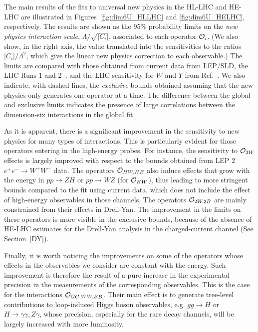 The main results of the fits to universal new physics in the HL-LHC and HE-LHC are illustrated in Figures~\ref{fig:dim6U_HLLHC} and \ref{fig:dim6U_HELHC}, respectively.
The results are shown as the 95\% probability limits on the {\it new physics interaction scale}, $\Lambda/\sqrt{\vert C_i\vert }$, associated to each operator ${\cal O}_i$. (We also show, in the right axis, the value translated into the sensitivities to the ratios $\vert C_i\vert /\Lambda^2$, which give the linear new physics correction to each observable.)
The limits are compared with those obtained from current data from LEP/SLD, the LHC Runs 1 and 2~\cite{deBlas:2016ojx,deBlas:2016nqo,deBlas:2017wmn,hepfit:2019}, and the LHC sensitivity for $W$ and $Y$ from Ref.~\cite{Farina:2016rws}. We also indicate, with dashed lines, the {\it exclusive} bounds obtained assuming that the new physics only generates one operator at a time. The difference between the global and exclusive limits indicates the presence of large correlations between the dimension-six interactions in the global fit.

As it is apparent, there is a significant improvement in the sensitivity to new physics for many types of interactions. This is particularly evident for those operators entering in the high-energy probes. For instance, the sensitivity to ${\cal O}_{3W}$ effects is largely improved with respect to the bounds obtained from LEP 2 $e^+ e^- \to W^+ W^-$ data. The operators ${\cal O}_{HW,HB}$ also induce effects that grow with the energy in $pp\to ZH$ or $pp\to WZ$ (for ${\cal O}_{HW}$), thus leading to more stringent bounds compared to the fit using current data, which does not include the effect of high-energy observables in those channels. The operators ${\cal O}_{2W,2B}$ are mainly constrained from their effects in Drell-Yan. The improvement in the limits on these operators is more visible in the exclusive bounds, because of the absence of HE-LHC estimates for the Drell-Yan analysis in the charged-current channel (See Section~\ref{DY}).

Finally, it is worth noticing the improvements on some of the operators whose effects in the observables we consider are constant with the energy.  Such improvement is therefore the result of a pure increase in the experimental precision in the measurements of the corresponding observables. This is the case for the interactions ${\cal O}_{GG,WW,BB}$. Their main effect is to generate tree-level contributions to loop-induced Higgs boson observables, e.g. $gg\to H$ or $H\to \gamma\gamma, Z\gamma$, whose precision, especially for the rare decay channels, will be largely increased with more luminosity.

